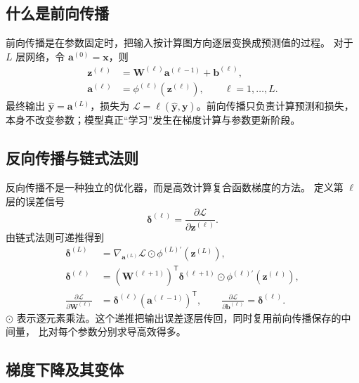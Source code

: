 \documentclass[UTF8,zihao=-4,a4paper,fontset=windows]{ctexart}
\newcommand{\loss}{\mathcal{L}}
\begin{document}
\subsection{什么是前向传播}

前向传播是在参数固定时，把输入按计算图方向逐层变换成预测值的过程。
对于 $L$ 层网络，令 $\bm{a}^{(0)}=\bm{x}$，则
\begin{align}
  \bm{z}^{(\ell)}
  &=\bm{W}^{(\ell)}\bm{a}^{(\ell-1)}+\bm{b}^{(\ell)},\\
  \bm{a}^{(\ell)}
  &=\phi^{(\ell)}(\bm{z}^{(\ell)}),
  \qquad \ell=1,\ldots,L.
\end{align}
最终输出 $\hat{\bm{y}}=\bm{a}^{(L)}$，损失为
$\loss=\ell(\hat{\bm{y}},\bm{y})$。前向传播只负责计算预测和损失，
本身不改变参数；模型真正“学习”发生在梯度计算与参数更新阶段。

\subsection{反向传播与链式法则}

反向传播不是一种独立的优化器，而是高效计算复合函数梯度的方法\cite{rumelhart}。
定义第 $\ell$ 层的误差信号
\begin{equation}
  \bm{\delta}^{(\ell)}
  =\frac{\partial\loss}{\partial\bm{z}^{(\ell)}}.
\end{equation}
由链式法则可递推得到
\begin{align}
  \bm{\delta}^{(L)}
  &=\nabla_{\bm{a}^{(L)}}\loss
    \odot \phi^{(L)\prime}(\bm{z}^{(L)}),\\
  \bm{\delta}^{(\ell)}
  &=\left(\bm{W}^{(\ell+1)}\right)^{\mathsf T}
    \bm{\delta}^{(\ell+1)}
    \odot \phi^{(\ell)\prime}(\bm{z}^{(\ell)}),\\
  \frac{\partial\loss}{\partial\bm{W}^{(\ell)}}
  &=\bm{\delta}^{(\ell)}
    \left(\bm{a}^{(\ell-1)}\right)^{\mathsf T},\qquad
  \frac{\partial\loss}{\partial\bm{b}^{(\ell)}}
  =\bm{\delta}^{(\ell)}.
\end{align}
$\odot$ 表示逐元素乘法。这个递推把输出误差逐层传回，同时复用前向传播保存的中间量，
比对每个参数分别求导高效得多。

\subsection{梯度下降及其变体}
\end{document}
